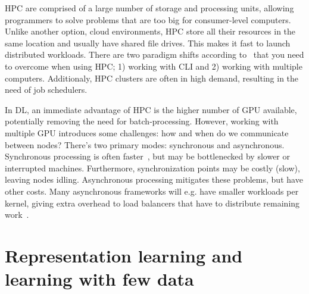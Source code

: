 \documentclass[10pt,twocolumn,letterpaper]{article}
\begin{document}
\gls{HPC} are comprised of a large number of storage and processing units, allowing programmers to solve problems that are too big for consumer-level computers. Unlike another option, cloud environments, \gls{HPC} store all their resources in the same location and usually have shared file drives. This makes it fast to launch distributed workloads. There are two paradigm shifts according to~\cite{sigma2GPU} that you need to overcome when using \gls{HPC}; 1) working with \gls{CLI} and 2) working with multiple computers. Additionaly, \gls{HPC} clusters are often in high demand, resulting in the need of job schedulers. 

In \gls{DL}, an immediate advantage of \gls{HPC} is the higher number of \gls{GPU} available, potentially removing the need for batch-processing. However, working with multiple \gls{GPU} introduces some challenges: how and when do we communicate between nodes? There's two primary modes: synchronous and asynchronous. Synchronous processing is often faster~\cite{distributedDL}, but may be bottlenecked by slower or interrupted machines. Furthermore, synchronization points may be costly (slow), leaving nodes idling. Asynchronous processing mitigates these problems, but have other costs. Many asynchronous frameworks will e.g. have smaller workloads per kernel, giving extra overhead to load balancers that have to distribute remaining work~\cite{pan2017synchronous}.


\section{Representation learning and learning with few data}\label{sec:cheese}

\end{document}
